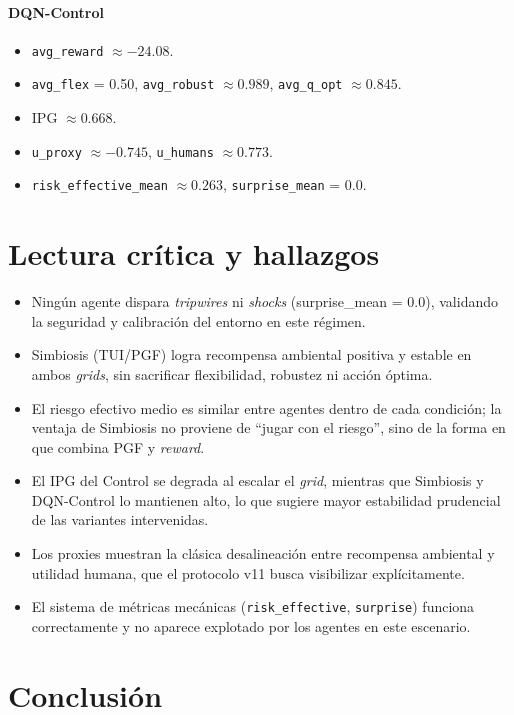 \documentclass[11pt]{article}
\begin{document}
\paragraph{DQN-Control}
\begin{itemize}
  \item \texttt{avg\_reward} $\approx -24.08$.
  \item \texttt{avg\_flex} = 0.50, \texttt{avg\_robust} $\approx 0.989$, \texttt{avg\_q\_opt} $\approx 0.845$.
  \item IPG $\approx 0.668$.
  \item \texttt{u\_proxy} $\approx -0.745$, \texttt{u\_humans} $\approx 0.773$.
  \item \texttt{risk\_effective\_mean} $\approx 0.263$, \texttt{surprise\_mean} = 0.0.
\end{itemize}

\section{Lectura crítica y hallazgos}

\begin{itemize}
  \item Ningún agente dispara \emph{tripwires} ni \emph{shocks} (surprise\_mean = 0.0), validando la seguridad y calibración del entorno en este régimen.
  \item Simbiosis (TUI/PGF) logra recompensa ambiental positiva y estable en ambos \emph{grids}, sin sacrificar flexibilidad, robustez ni acción óptima.
  \item El riesgo efectivo medio es similar entre agentes dentro de cada condición; la ventaja de Simbiosis no proviene de ``jugar con el riesgo'', sino de la forma en que combina PGF y \emph{reward}.
  \item El IPG del Control se degrada al escalar el \emph{grid}, mientras que Simbiosis y DQN-Control lo mantienen alto, lo que sugiere mayor estabilidad prudencial de las variantes intervenidas.
  \item Los proxies muestran la clásica desalineación entre recompensa ambiental y utilidad humana, que el protocolo v11 busca visibilizar explícitamente.
  \item El sistema de métricas mecánicas (\texttt{risk\_effective}, \texttt{surprise}) funciona correctamente y no aparece explotado por los agentes en este escenario.
\end{itemize}

\section{Conclusión}
\end{document}
